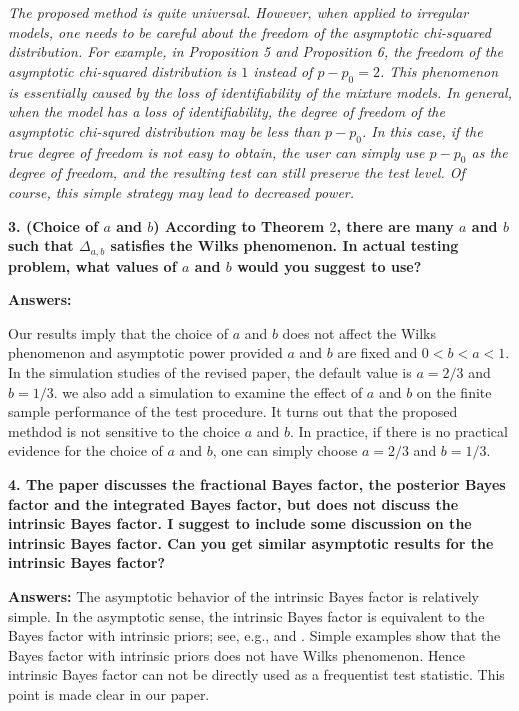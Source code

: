 \documentclass[11pt]{article}
\theoremstyle{plain}
\theoremstyle{definition}
\theoremstyle{remark}
\begin{document}
\begin{adjustwidth}{1.5em}{1.5em}
    \emph{
The proposed method is quite universal. 
However, when applied to irregular models, one needs to be careful about the freedom of the asymptotic chi-squared distribution.
For example, in Proposition 5 and Proposition 6, the freedom of the asymptotic chi-squared distribution is $1$ instead of $p-p_0 = 2$.
This phenomenon is essentially caused by the loss of identifiability of the mixture models.
In general, when the model has a loss of identifiability, the degree of freedom of the asymptotic chi-squred distribution may be less than $p-p_0$.
In this case, if the true degree of freedom is not easy to obtain, the user can simply use $p-p_0$ as the degree of freedom, and the resulting test can still preserve the test level.
Of course, this simple strategy may lead to decreased power.
}
\end{adjustwidth}


\textbf{
    3. (Choice of $a$ and $b$) According to Theorem $2$, there are many $a$ and $b$ such that $\Delta_{a,b}$ satisfies the Wilks phenomenon.
    In actual testing problem, what values of $a$ and $b$ would you suggest to use?
}

\textbf{Answers:}

Our results imply that the choice of $a$ and $b$ does not affect the Wilks phenomenon and asymptotic power provided $a$ and $b$ are fixed and $0<b<a<1$.
In the simulation studies of the revised paper, the default value is $a=2/3$ and $b= 1/3$.
we also add a simulation to examine the effect of $a$ and $b$ on the finite sample performance of the test procedure.
It turns out that the proposed methdod is not sensitive to the choice $a$ and $b$.
In practice, if there is no practical evidence for the choice of $a$ and $b$, one can simply choose $a = 2/3$ and $b = 1/3$.

\textbf{
    4. The paper discusses the fractional Bayes factor, the posterior Bayes factor and the integrated Bayes factor, but does not discuss the intrinsic Bayes factor. I suggest to include some discussion on the intrinsic Bayes factor. Can you get similar asymptotic results for the intrinsic Bayes factor?
}

\textbf{Answers:}
The asymptotic behavior of the intrinsic Bayes factor is relatively simple.
In the asymptotic sense, the intrinsic Bayes factor is equivalent to the Bayes factor with intrinsic priors; see, e.g., \cite{intrisicBayesFactor} and \cite{Moreno1998An}.
Simple examples show that the Bayes factor with intrinsic  priors does not have Wilks phenomenon.
Hence intrinsic Bayes factor can not be directly used as a frequentist test statistic.
This point is made clear in our paper.
\end{document}

